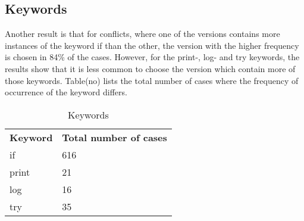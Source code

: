 \subsection{Keywords}
Another result is that for conflicts, where one of the versions contains more instances of the keyword if than the other, the version with the higher frequency is chosen in 84\% of the cases. However, for the print-, log- and try keywords, the results show that it is less common to choose the version which contain more of those keywords. Table(no) lists the total number of cases where the frequency of occurrence of the keyword differs.
\begin{table}
\begin{tabular}{ p{8cm} p{6cm} }
\hline
\multicolumn{1}{c}{\textbf{Keyword}} & \multicolumn{1}{c}{\textbf{Total number of cases}}\\
if & 616\\
print & 21\\
log & 16\\
try & 35\\
\end{tabular}
\caption{Keywords}\label{table:keywords}
\end{table}




